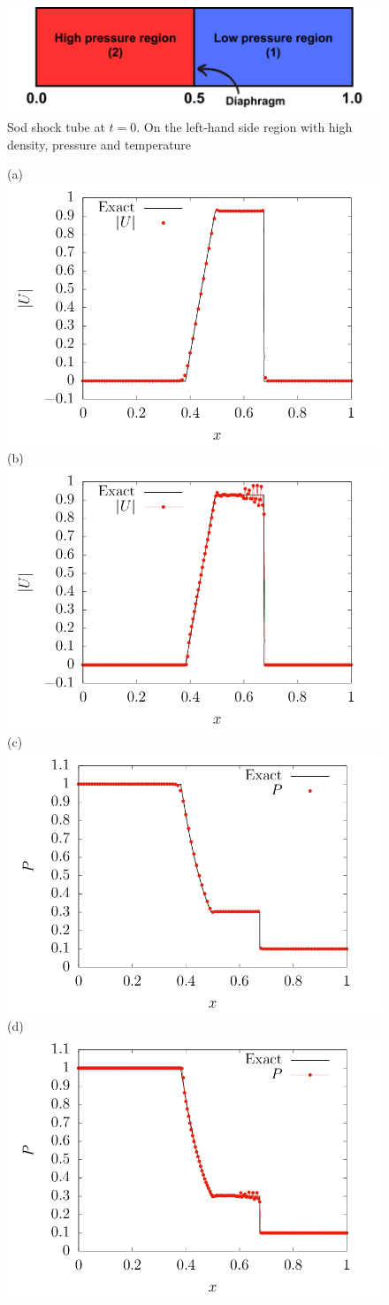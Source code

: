 \documentclass[a5paper]{sapthesis}
\begin{document}
	\begin{figure}
		\centering
		\includegraphics[width=0.8 \linewidth]{Figures/SOD_TUBE_GEOMETRY}
		\caption{Sod shock tube at $t = 0$. On the left-hand side region with high density, pressure and temperature}
		\label{Sod_geometry}
	\end{figure} 
	
	\begin{figure}
		\centering
		(a)\includegraphics[width=0.45\linewidth]{Figures/Sod_umag_ref}
		(b)\includegraphics[width=0.45\linewidth]{Figures/Sod_umag_rcf}\\
		(c)\includegraphics[width=0.45\linewidth]{Figures/Sod_p_ref}
		(d)\includegraphics[width=0.45\linewidth]{Figures/Sod_p_rcf}\\

\end{figure}
\end{document}
